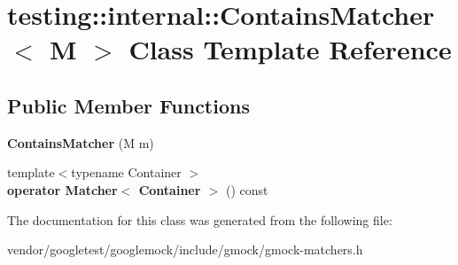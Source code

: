 \hypertarget{classtesting_1_1internal_1_1ContainsMatcher}{}\section{testing\+:\+:internal\+:\+:Contains\+Matcher$<$ M $>$ Class Template Reference}
\label{classtesting_1_1internal_1_1ContainsMatcher}
\subsection*{Public Member Functions}
\begin{DoxyCompactItemize}
\item 
{\bfseries Contains\+Matcher} (M m)\hypertarget{classtesting_1_1internal_1_1ContainsMatcher_a063d429bb4e59087ecdd51a037b8128a}{}\label{classtesting_1_1internal_1_1ContainsMatcher_a063d429bb4e59087ecdd51a037b8128a}

\item 
{\footnotesize template$<$typename Container $>$ }\\{\bfseries operator Matcher$<$ Container $>$} () const \hypertarget{classtesting_1_1internal_1_1ContainsMatcher_a0a2b7d05dfc47e86e0a16d6915b9fac5}{}\label{classtesting_1_1internal_1_1ContainsMatcher_a0a2b7d05dfc47e86e0a16d6915b9fac5}

\end{DoxyCompactItemize}


The documentation for this class was generated from the following file\+:\begin{DoxyCompactItemize}
\item 
vendor/googletest/googlemock/include/gmock/gmock-\/matchers.\+h\end{DoxyCompactItemize}
